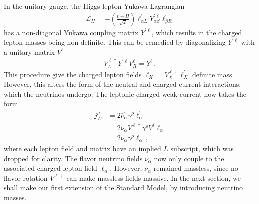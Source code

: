 In the unitary gauge, the Higgs-lepton Yukawa Lagrangian 
\begin{align}
    \label{eq:YukawaLagrangian}
    \mathcal{L}_{H}=-\left( \frac{v + H}{\sqrt{2}} \right) \ell_{\alpha L}^{\prime} Y_{\alpha \beta}^{\prime \ell} \ell_{\beta R}^{\prime}
\end{align}
has a non-diagonal Yukawa coupling matrix $Y^{\prime \ell}$, which results in the charged lepton masses being non-definite. This can be remedied by diagonalizing $Y^{\prime \ell}$ with a unitary matrix $V^\ell$
\begin{align}\label{eq:leptonYukawaDiag}
    V_{L}^{\ell \dagger} Y^{\prime \ell} V_{R}^{\ell}=Y^{\ell}\,.
\end{align}
This procedure give the charged lepton fields $\ell_{X}=V_{X}^{\ell \dagger} \ell_{X}^{\prime}$ definite mass. 
However, this alters the form of the neutral and charged current interactions, which the neutrinos undergo. The leptonic charged weak current now takes the form
\begin{align}
    \label{eq:j_CC}
    j^\rho_W &= 2 \bar{\nu}^\prime_\alpha \gamma^\rho \ell^\prime_\alpha \nonumber \\
             &= 2 \bar{\nu}_\alpha V^{\ell \dagger} \gamma^\rho V^\ell \ell_\alpha \nonumber \\
             &= 2 \bar{\nu}_\alpha \gamma^\rho \ell_\alpha\,,
\end{align}
where each lepton field and matrix have an implied $L$ subscript, which was dropped for clarity. The flavor neutrino fields $\nu_\alpha$ now only couple to the associated charged lepton field $\ell_\alpha$. However, 
$\nu_\alpha$ remained massless, since no flavor rotation $V^{\ell \dagger}$ can make massless fields massive. In the next section,
we shall make our first extension of the Standard Model, by introducing neutrino masses.
% 
% 
% 